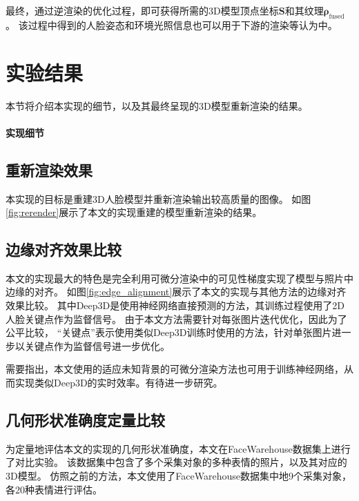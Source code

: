 最终，通过逆渲染的优化过程，即可获得所需的3D模型顶点坐标$\mathbf{S}$和其纹理$\mathbf{\rho}_\mathrm{fused}$。
该过程中得到的人脸姿态和环境光照信息也可以用于下游的渲染等认为中。

\section{实验结果}

本节将介绍本实现的细节，以及其最终呈现的3D模型重新渲染的结果。

\paragraph{实现细节}


\subsection{重新渲染效果}

本实现的目标是重建3D人脸模型并重新渲染输出较高质量的图像。
如图\ref{fig:rerender}展示了本文的实现重建的模型重新渲染的结果。

\subsection{边缘对齐效果比较}

本文的实现最大的特色是完全利用可微分渲染中的可见性梯度实现了模型与照片中边缘的对齐。
如图\ref{fig:edge_alignment}展示了本文的实现与其他方法的边缘对齐效果比较。
其中Deep3D\citep{deep3d}是使用神经网络直接预测的方法，其训练过程使用了2D人脸关键点作为监督信号。
由于本文方法需要针对每张图片迭代优化，因此为了公平比较，
“关键点”表示使用类似Deep3D训练时使用的方法，针对单张图片进一步以关键点作为监督信号进一步优化。

需要指出，本文使用的适应未知背景的可微分渲染方法也可用于训练神经网络，从而实现类似Deep3D的实时效率。有待进一步研究。

\subsection{几何形状准确度定量比较}

为定量地评估本文的实现的几何形状准确度，本文在FaceWarehouse数据集上进行了对比实验。
该数据集中包含了多个采集对象的多种表情的照片，以及其对应的3D模型。
仿照之前的方法，本文使用了FaceWarehouse数据集中地9个采集对象，各20种表情进行评估。

